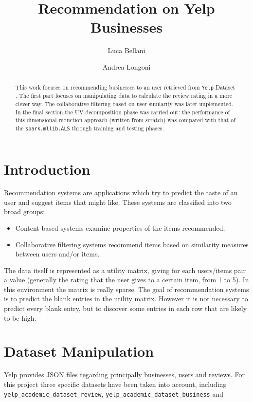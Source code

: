 \documentclass{article}
\begin{document}
\title{\textbf{Recommendation on Yelp Businesses}}
\author{Luca Bellani}
\author{Andrea Longoni}
\date{}

\maketitle


\begin{abstract}
	This work focuses on recommending businesses to an user retrieved from \texttt{Yelp} Dataset \cite{datasetKaggle}. The first part focuses on manipulating data to calculate the review rating in a more clever way. The collaborative filtering based on user similarity was later implemented. In the final section the UV decomposition phase was carried out: the performance of this dimensional reduction approach (written from scratch) was compared with that of the  \texttt{spark.mllib.ALS} \cite{als} through training and testing phases.
 
\end{abstract}
    

\section{Introduction}
Recommendation systems are applications which try to predict the taste of an user and suggest items that might like. These systems are classified into two broad groups:
\begin{itemize}
    \item Content-based systems examine properties of the items recommended;
    \item Collaborative filtering systems recommend items based on similarity measures between users and/or items.
\end{itemize}

The data itself is represented as a utility matrix, giving for each users/items pair a value (generally the rating that the user gives to a certain item, from 1 to 5). In this environment the matrix is really sparse. The goal of recommendation systems is to predict the blank entries in the utility matrix. However it is not necessary to predict every blank entry, but to discover some entries in each row that are likely to be high. 
\section{Dataset Manipulation}
Yelp provides JSON files regarding principally businesses, users and reviews. For this project three specific datasets have been taken into account, including \texttt{yelp\_academic\_dataset\_review}, \texttt{yelp\_academic\_dataset\_business} and 
\end{document}
